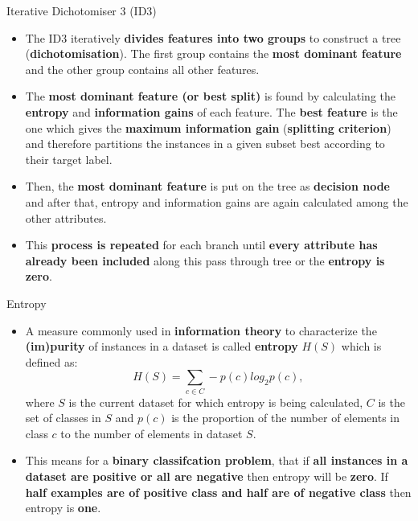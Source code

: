 \documentclass[document.tex]{subfiles}
\begin{document}
   	\begin{frame}{Iterative Dichotomiser 3 (ID3)}
        \begin{itemize}
            \item The ID3 iteratively \textbf{divides features into two groups} to construct a tree (\textbf{dichotomisation}). The first group contains the \textbf{most dominant feature} and the other group contains all other features. 
            \item The \textbf{most dominant feature (or best split)} is found by calculating the \textbf{entropy} and \textbf{information gains} of each feature. The \textbf{best feature} is the one which gives the \textbf{maximum information gain} (\textbf{splitting criterion}) and therefore partitions the instances in a given subset best according to their target label.
            \item Then, the \textbf{most dominant feature} is put on the tree as \textbf{decision node} and after that, entropy and information gains are again calculated among the other attributes.
            \item This \textbf{process is repeated} for each branch until \textbf{every attribute has already been included} along this pass through tree or the \textbf{entropy is zero}.
        \end{itemize}
    \end{frame}
    
    \begin{frame}{Entropy}
        \begin{itemize}
            \item A measure commonly used in \textbf{information theory} to characterize the \textbf{(im)purity} of instances in a dataset is called \textbf{entropy} $H(S)$ which is defined as:
            $$
            H(S) = \sum_{c \in C}-p(c)log_2p(c),
            $$
            where $S$ is the current dataset for which entropy is being calculated, $C$ is the set of classes in $S$ and $p(c)$ is the proportion of the number of elements in class $c$ to the number of elements in dataset $S$.
            \item This means for a \textbf{binary classifcation problem}, that if \textbf{all instances in a dataset are positive or all are negative} then entropy will be \textbf{zero}. If \textbf{half examples are of positive class and half are of negative class} then entropy is \textbf{one}.
        \end{itemize}
    \end{frame}
    
\end{document}
